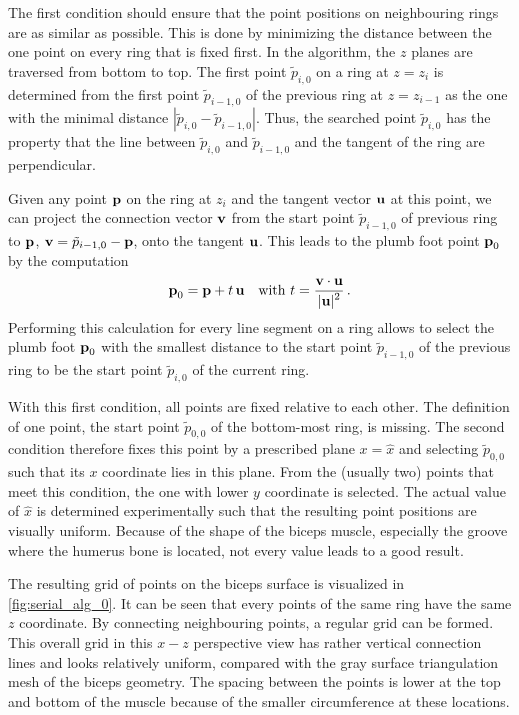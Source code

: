 The first condition should ensure that the point positions on neighbouring rings are as similar as possible. This is done by minimizing the distance between the one point on every ring that is fixed first.
In the algorithm, the $z$ planes are traversed from bottom to top. The first point $\tilde{p}_{i,0}$ on a ring at $z=z_i$ is determined from the first point $\tilde{p}_{i-1,0}$ of the previous ring at $z=z_{i-1}$ as the one with the minimal distance $|\tilde{p}_{i,0} - \tilde{p}_{i-1,0}|$. Thus, the searched point $\tilde{p}_{i,0}$ has the property that the line between $\tilde{p}_{i,0}$ and $\tilde{p}_{i-1,0}$ and the tangent of the ring are perpendicular.

Given any point $\textbf{p}$ on the ring at $z_i$ and the tangent vector $\textbf{u}$ at this point, we can project the connection vector $\textbf{v}$ from the start point $\tilde{p}_{i-1,0}$ of previous ring to $\textbf{p}$, $\textbf{v} = \tilde{p}_{i-1,0} - \textbf{p}$, onto the tangent $\textbf{u}$. This leads to the plumb foot point $\textbf{p}_0$ by the computation
\begin{equation*}
  \begin{array}{lll}
    \textbf{p}_0 = \textbf{p} + t\,\textbf{u} \quad \text{with }t = \displaystyle\frac{\displaystyle{\textbf{v}\cdot \textbf{u}}}{\displaystyle{|\textbf{u}|^2}}\,.
  \end{array}
\end{equation*}
Performing this calculation for every line segment on a ring allows to select the plumb foot $\textbf{p}_0$ with the smallest distance to the start point $\tilde{p}_{i-1,0}$ of the previous ring to be the start point $\tilde{p}_{i,0}$ of the current ring.

With this first condition, all points are fixed relative to each other. The definition of one point, the start point $\tilde{p}_{0,0}$ of the bottom-most ring, is missing. The second condition therefore fixes this point by a prescribed plane $x = \hat{x}$ and selecting $\tilde{p}_{0,0}$ such that its $x$ coordinate lies in this plane. From the (usually two) points that meet this condition, the one with lower $y$ coordinate is selected. The actual value of $\hat{x}$ is determined experimentally such that the resulting point positions are visually uniform. Because of the shape of the biceps muscle, especially the groove where the humerus bone is located, not every value leads to a good result.

The resulting grid of points on the biceps surface is visualized in \cref{fig:serial_alg_0}. It can be seen that every points of the same ring have the same $z$ coordinate. By connecting neighbouring points, a regular grid can be formed. This overall grid in this $x-z$ perspective view has rather vertical connection lines and looks relatively uniform, compared with the gray surface triangulation mesh of the biceps geometry. The spacing between the points is lower at the top and bottom of the muscle because of the smaller circumference at these locations.

